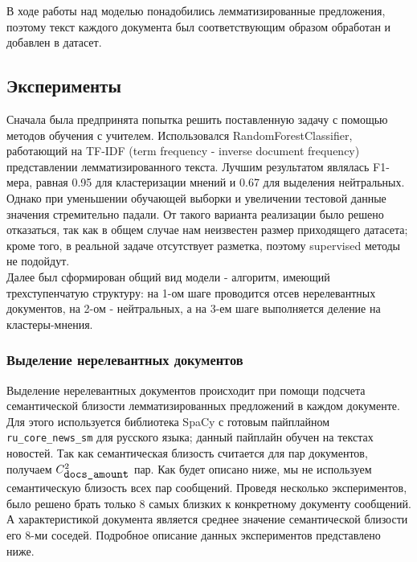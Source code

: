 \documentclass{article}
\begin{document}
В ходе работы над моделью понадобились лемматизированные предложения, поэтому текст каждого документа был соответствующим образом обработан и добавлен в датасет.
\subsection{Эксперименты}
Сначала была предпринята попытка решить поставленную задачу с помощью методов обучения с учителем. Использовался RandomForestClassifier, работающий на TF-IDF (term frequency - inverse document frequency) представлении лемматизированного текста. Лучшим результатом являлась F1-мера, равная 0.95 для кластеризации мнений и 0.67 для выделения нейтральных. Однако при уменьшении обучающей выборки и увеличении тестовой данные значения стремительно падали. От такого варианта реализации было решено отказаться, так как в общем случае нам неизвестен размер приходящего датасета; кроме того, в реальной задаче отсутствует разметка, поэтому supervised методы не подойдут.\\

Далее был сформирован общий вид модели - алгоритм, имеющий трехступенчатую структуру: на 1-ом шаге проводится отсев нерелевантных документов, на 2-ом - нейтральных, а на 3-ем шаге выполняется деление на кластеры-мнения.\\

\subsubsection{Выделение нерелевантных документов}
Выделение нерелевантных документов происходит при помощи подсчета семантической близости лемматизированных предложений в каждом документе. Для этого используется библиотека SpaCy с готовым пайплайном \verb|ru_core_news_sm| для русского языка; данный пайплайн обучен на текстах новостей. Так как семантическая близость считается для пар документов, получаем $C_{\verb|docs_amount|}^2$ пар. Как будет описано ниже, мы не используем семантическую близость всех пар сообщений. Проведя несколько экспериментов, было решено брать только 8 самых близких к конкретному документу сообщений. А характеристикой документа является среднее значение семантической близости его 8-ми соседей. Подробное описание данных экспериментов представлено ниже.\\
\end{document}

